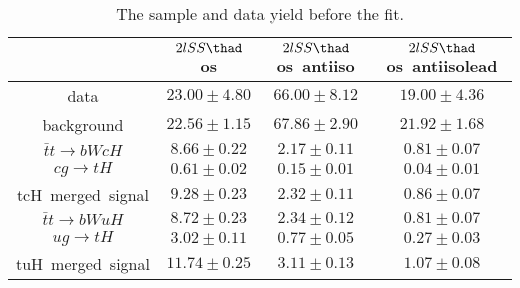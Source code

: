 \begin{table}
\footnotesize
\caption{The sample and data yield before the fit.}
\centering
\begin{tabular}{|c|c|c|c|} \hline
 & $2lSS\thad$ os & $2lSS\thad$ os~antiiso & $2lSS\thad$ os~antiisolead\\\hline
data & $23.00\pm4.80$ & $66.00\pm8.12$ & $19.00\pm4.36$\\\hline
background & $22.56\pm1.15$ & $67.86\pm2.90$ & $21.92\pm1.68$\\\hline
$\bar{t}t\to bWcH$ & $8.66\pm0.22$ & $2.17\pm0.11$ & $0.81\pm0.07$\\\hline
$cg\to tH$ & $0.61\pm0.02$ & $0.15\pm0.01$ & $0.04\pm0.01$\\\hline
tcH~merged~signal & $9.28\pm0.23$ & $2.32\pm0.11$ & $0.86\pm0.07$\\\hline
$\bar{t}t\to bWuH$ & $8.72\pm0.23$ & $2.34\pm0.12$ & $0.81\pm0.07$\\\hline
$ug\to tH$ & $3.02\pm0.11$ & $0.77\pm0.05$ & $0.27\pm0.03$\\\hline
tuH~merged~signal & $11.74\pm0.25$ & $3.11\pm0.13$ & $1.07\pm0.08$\\\hline
\end{tabular}
\label{tab:yield}
\end{table}
